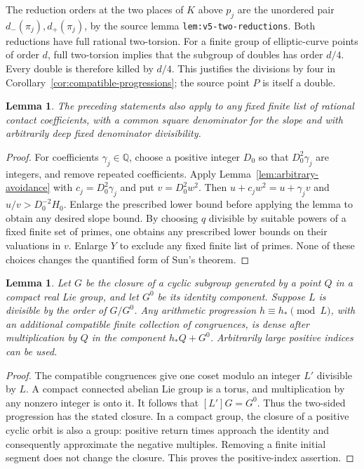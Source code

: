 \documentclass[11pt,a4paper]{article}
\newtheorem{lemma}[theorem]{Lemma}
\theoremstyle{remark}\newtheorem{remark}[theorem]{Remark}
\newcommand{\Q}{\mathbb Q}\newcommand{\Z}{\mathbb Z}
\begin{document}
The reduction orders at the two places of $K$ above $p_j$ are the
unordered pair $d_-(\pi_j),d_+(\pi_j)$, by the source lemma
\nolinkurl{lem:v5-two-reductions}. Both reductions have full rational
two-torsion. For a finite group of elliptic-curve points of order $d$,
full two-torsion implies that the subgroup of doubles has order $d/4$.
Every double is therefore killed by $d/4$. This justifies the divisions
by four in Corollary~\ref{cor:compatible-progressions}; the source point
$P$ is itself a double.

\begin{lemma}\label{lem:rational-contacts}
The preceding statements also apply to any fixed finite list of
rational contact coefficients, with a common square denominator for
the slope and with arbitrarily deep fixed denominator divisibility.
\end{lemma}
\begin{proof}
For coefficients $\gamma_j\in\Q$, choose a positive integer $D_0$
so that $D_0^2\gamma_j$ are integers, and remove repeated coefficients.
Apply Lemma~\ref{lem:arbitrary-avoidance} with
$c_j=D_0^2\gamma_j$ and put $v=D_0^2w^2$.
Then $u+c_jw^2=u+\gamma_jv$ and $u/v>D_0^{-2}H_0$.
Enlarge the prescribed lower bound before applying the lemma to obtain
any desired slope bound. By choosing $q$ divisible by suitable powers
of a fixed finite set of primes, one obtains any prescribed lower
bounds on their valuations in $v$. Enlarge $Y$ to exclude any fixed
finite list of primes. None of these choices changes the quantified
form of Sun's theorem.
\end{proof}

\begin{lemma}\label{lem:real-progression}
Let $G$ be the closure of a cyclic subgroup generated by a point $Q$
in a compact real Lie group, and let $G^0$ be its identity component.
Suppose $L$ is divisible by the order of $G/G^0$. Any arithmetic
progression $h\equiv h_*\pmod L$, with an additional compatible
finite collection of congruences, is dense after multiplication by
$Q$ in the component $h_*Q+G^0$. Arbitrarily large positive indices
can be used.
\end{lemma}
\begin{proof}
The compatible congruences give one coset modulo an integer $L'$
divisible by $L$. A compact connected abelian Lie group is a torus,
and multiplication by any nonzero integer is onto it. It follows that
$[L']G=G^0$. Thus the two-sided progression has the stated closure.
In a compact group, the closure of a positive cyclic orbit is also
a group: positive return times approach the identity and consequently
approximate the negative multiples. Removing a finite initial segment
does not change the closure. This proves the positive-index assertion.
\end{proof}
\end{document}
